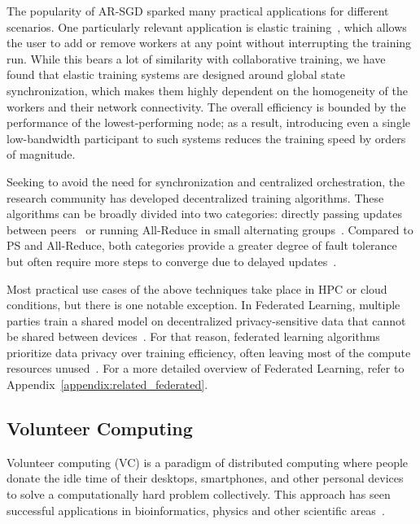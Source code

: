 The popularity of AR-SGD sparked many practical applications for different scenarios. One particularly relevant application is elastic training~\cite{pytorch_elastic,elastic_horovod}, which allows the user to add or remove workers at any point without interrupting the training run.
While this bears a lot of similarity with collaborative training, we have found that elastic training systems are designed around global state synchronization, which makes them highly dependent on the homogeneity of the workers and their network connectivity. The overall efficiency is bounded by the performance of the lowest-performing node; as a result, introducing even a single low-bandwidth participant to such systems reduces the training speed by orders of magnitude.

Seeking to avoid the need for synchronization and centralized orchestration, the research community has developed decentralized training algorithms. These algorithms can be broadly divided into two categories: directly passing updates between peers~\cite{sgp,slowmo} or running All-Reduce in small alternating groups~\cite{moshpit,wagma}. Compared to PS and All-Reduce, both categories provide a greater degree of fault tolerance but often require more steps to converge due to delayed updates~\cite{dp_sgd,wagma}.

Most practical use cases of the above techniques take place in HPC or cloud conditions, but there is one notable exception. In Federated Learning, multiple parties train a shared model on decentralized privacy-sensitive data that cannot be shared between devices~\cite{FedLearningOriginal}. For that reason, federated learning algorithms prioritize data privacy over training efficiency, often leaving most of the compute resources unused~\cite{FedLearningAtScale,FedLearningDecentralized}. For a more detailed overview of Federated Learning, refer to Appendix~\ref{appendix:related_federated}.



\subsection{Volunteer Computing}\label{sect:related_volunteer}

Volunteer computing (VC) is a paradigm of distributed computing where people donate the idle time of their desktops, smartphones, and other personal devices to solve a computationally hard problem collectively. This approach has seen successful applications in bioinformatics, physics and other scientific areas~\cite{larson_crowd, folding_covid, lhc_at_home, seti_at_home, qmc_at_home, folding_timeline,einstein_at_home}.

